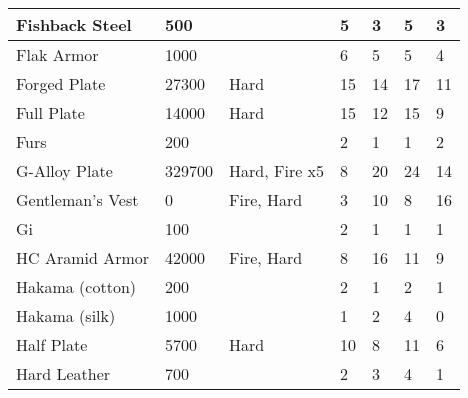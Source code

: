 \documentclass[twoside]{book}
\begin{document}
\begin{longtable}{p{1.25in}llp{2em}p{2em}p{2em}p{2em}}
  \raggedright
           Fishback Steel 
  &
   500 
  &
  
  &
   5 
  &
   3 
  &
   5 
  &
   3 
  \tabularnewline
  \hline
      
  \raggedright
           Flak Armor 
  &
   1000 
  &
  
  &
   6 
  &
   5 
  &
   5 
  &
   4 
  \tabularnewline
  \hline
      
  \raggedright
           Forged Plate 
  &
   27300 
  &
   Hard 
  &
   15 
  &
   14 
  &
   17 
  &
   11 
  \tabularnewline
  \hline
      
  \raggedright
           Full Plate 
  &
   14000 
  &
   Hard 
  &
   15 
  &
   12 
  &
   15 
  &
   9 
  \tabularnewline
  \hline
      
  \raggedright
           Furs 
  &
   200 
  &
  
  &
   2 
  &
   1 
  &
   1 
  &
   2 
  \tabularnewline
  \hline
      
  \raggedright
           G-Alloy Plate 
  &
   329700 
  &
   Hard, Fire x5 
  &
   8 
  &
   20 
  &
   24 
  &
   14 
  \tabularnewline
  \hline
      
  \raggedright
           Gentleman's Vest 
  &
   0 
  &
   Fire, Hard 
  &
   3 
  &
   10 
  &
   8 
  &
   16 
  \tabularnewline
  \hline
      
  \raggedright
           Gi 
  &
   100 
  &
  
  &
   2 
  &
   1 
  &
   1 
  &
   1 
  \tabularnewline
  \hline
      
  \raggedright
           HC Aramid Armor 
  &
   42000 
  &
   Fire, Hard 
  &
   8 
  &
   16 
  &
   11 
  &
   9 
  \tabularnewline
  \hline
      
  \raggedright
           Hakama (cotton) 
  &
   200 
  &
  
  &
   2 
  &
   1 
  &
   2 
  &
   1 
  \tabularnewline
  \hline
      
  \raggedright
           Hakama (silk) 
  &
   1000 
  &
  
  &
   1 
  &
   2 
  &
   4 
  &
   0 
  \tabularnewline
  \hline
      
  \raggedright
           Half Plate 
  &
   5700 
  &
   Hard 
  &
   10 
  &
   8 
  &
   11 
  &
   6 
  \tabularnewline
  \hline
      
  \raggedright
           Hard Leather 
  &
   700 
  &
  
  &
   2 
  &
   3 
  &
   4 
  &
   1 
  \tabularnewline
  \hline
      

\end{longtable}
\end{document}
